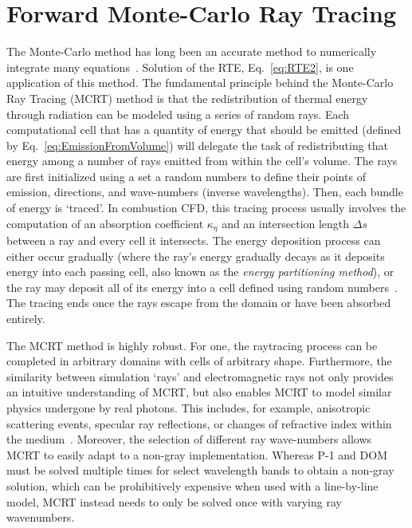 \section{Forward Monte-Carlo Ray Tracing}\label{section:ForwardMC}
The Monte-Carlo method has long been an accurate method to numerically integrate many equations~\cite{Howell2021TheTransfer}.
Solution of the RTE, Eq.~\ref{eq:RTE2}, is one application of this method. 
The fundamental principle behind the Monte-Carlo Ray Tracing (MCRT) method is that the redistribution of thermal energy through radiation can be modeled using a series of random rays. 
Each computational cell that has a quantity of energy that should be emitted (defined by Eq.~\ref{eq:EmissionFromVolume}) will delegate the task of redistributing that energy among a number of rays emitted from within the cell's volume. The rays are first initialized using a set a random numbers to define their points of emission, directions, and wave-numbers (inverse wavelengths).
Then, each bundle of energy is `traced'.
In combustion CFD, this tracing process usually involves the computation of an absorption coefficient $\kappa_\eta$ and an intersection length $\Delta{}s$ between a ray and every cell it intersects.
The energy deposition process can either occur gradually (where the ray's energy gradually decays as it deposits energy into each passing cell, also known as the \textit{energy partitioning method}), or the ray may deposit all of its energy into a cell defined using random numbers~\cite{Modest2022ChapterMediac}.
The tracing ends once the rays escape from the domain or have been absorbed entirely.

The MCRT method is highly robust. For one, the raytracing process can be completed in arbitrary domains with cells of arbitrary shape. Furthermore, the similarity between simulation `rays' and electromagnetic rays not only provides an intuitive understanding of MCRT, but also enables MCRT to model similar physics undergone by real photons. This includes, for example, anisotropic scattering events, specular ray reflections, or changes of refractive index within the medium~\cite{Modest2022ChapterMediac}. Moreover, the selection of different ray wave-numbers allows MCRT to easily adapt to a non-gray implementation. Whereas P-1 and DOM must be solved multiple times for select wavelength bands to obtain a non-gray solution, which can be prohibitively expensive when used with a line-by-line model, MCRT instead needs to only be solved once with varying ray wavenumbers.

